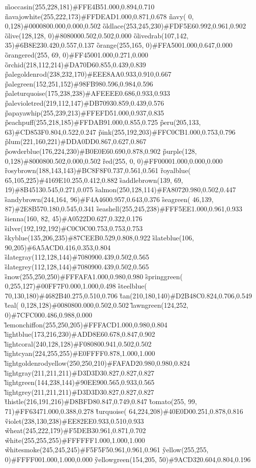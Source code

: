 \G{moccasin}{(255,228,181)}{\#FFE4B5}{1.000,0.894,0.710}
\G{navajowhite}{(255,222,173)}{\#FFDEAD}{1.000,0.871,0.678}
\G{navy}{(  0,  0,128)}{\#000080}{0.000,0.000,0.502}
\G{oldlace}{(253,245,230)}{\#FDF5E6}{0.992,0.961,0.902}
\G{olive}{(128,128,  0)}{\#808000}{0.502,0.502,0.000}
\G{olivedrab}{(107,142, 35)}{\#6B8E23}{0.420,0.557,0.137}
\G{orange}{(255,165,  0)}{\#FFA500}{1.000,0.647,0.000}
\G{orangered}{(255, 69,  0)}{\#FF4500}{1.000,0.271,0.000}
\G{orchid}{(218,112,214)}{\#DA70D6}{0.855,0.439,0.839}
\G{palegoldenrod}{(238,232,170)}{\#EEE8AA}{0.933,0.910,0.667}
\G{palegreen}{(152,251,152)}{\#98FB98}{0.596,0.984,0.596}
\G{paleturquoise}{(175,238,238)}{\#AFEEEE}{0.686,0.933,0.933}
\G{palevioletred}{(219,112,147)}{\#DB7093}{0.859,0.439,0.576}
\G{papayawhip}{(255,239,213)}{\#FFEFD5}{1.000,0.937,0.835}
\G{peachpuff}{(255,218,185)}{\#FFDAB9}{1.000,0.855,0.725}
\G{peru}{(205,133, 63)}{\#CD853F}{0.804,0.522,0.247}
\G{pink}{(255,192,203)}{\#FFC0CB}{1.000,0.753,0.796}
\G{plum}{(221,160,221)}{\#DDA0DD}{0.867,0.627,0.867}
\G{powderblue}{(176,224,230)}{\#B0E0E6}{0.690,0.878,0.902}
\G{purple}{(128,  0,128)}{\#800080}{0.502,0.000,0.502}
\G{red}{(255,  0,  0)}{\#FF0000}{1.000,0.000,0.000}
\G{rosybrown}{(188,143,143)}{\#BC8F8F}{0.737,0.561,0.561}
\G{royalblue}{( 65,105,225)}{\#4169E1}{0.255,0.412,0.882}
\G{saddlebrown}{(139, 69, 19)}{\#8B4513}{0.545,0.271,0.075}
\G{salmon}{(250,128,114)}{\#FA8072}{0.980,0.502,0.447}
\G{sandybrown}{(244,164, 96)}{\#F4A460}{0.957,0.643,0.376}
\G{seagreen}{( 46,139, 87)}{\#2E8B57}{0.180,0.545,0.341}
\G{seashell}{(255,245,238)}{\#FFF5EE}{1.000,0.961,0.933}
\G{sienna}{(160, 82, 45)}{\#A0522D}{0.627,0.322,0.176}
\G{silver}{(192,192,192)}{\#C0C0C0}{0.753,0.753,0.753}
\G{skyblue}{(135,206,235)}{\#87CEEB}{0.529,0.808,0.922}
\G{slateblue}{(106, 90,205)}{\#6A5ACD}{0.416,0.353,0.804}
\G{slategray}{(112,128,144)}{\#708090}{0.439,0.502,0.565}
\G{slategrey}{(112,128,144)}{\#708090}{0.439,0.502,0.565}
\G{snow}{(255,250,250)}{\#FFFAFA}{1.000,0.980,0.980}
\G{springgreen}{(  0,255,127)}{\#00FF7F}{0.000,1.000,0.498}
\G{steelblue}{( 70,130,180)}{\#4682B4}{0.275,0.510,0.706}
\G{tan}{(210,180,140)}{\#D2B48C}{0.824,0.706,0.549}
\G{teal}{(  0,128,128)}{\#008080}{0.000,0.502,0.502}
\G{lawngreen}{(124,252,  0)}{\#7CFC00}{0.486,0.988,0.000}
\G{lemonchiffon}{(255,250,205)}{\#FFFACD}{1.000,0.980,0.804}
\G{lightblue}{(173,216,230)}{\#ADD8E6}{0.678,0.847,0.902}
\G{lightcoral}{(240,128,128)}{\#F08080}{0.941,0.502,0.502}
\G{lightcyan}{(224,255,255)}{\#E0FFFF}{0.878,1.000,1.000}
\G{lightgoldenrodyellow}{(250,250,210)}{\#FAFAD2}{0.980,0.980,0.824}
\G{lightgray}{(211,211,211)}{\#D3D3D3}{0.827,0.827,0.827}
\G{lightgreen}{(144,238,144)}{\#90EE90}{0.565,0.933,0.565}
\G{lightgrey}{(211,211,211)}{\#D3D3D3}{0.827,0.827,0.827}
\G{thistle}{(216,191,216)}{\#D8BFD8}{0.847,0.749,0.847}
\G{tomato}{(255, 99, 71)}{\#FF6347}{1.000,0.388,0.278}
\G{turquoise}{( 64,224,208)}{\#40E0D0}{0.251,0.878,0.816}
\G{violet}{(238,130,238)}{\#EE82EE}{0.933,0.510,0.933}
\G{wheat}{(245,222,179)}{\#F5DEB3}{0.961,0.871,0.702}
\G{white}{(255,255,255)}{\#FFFFFF}{1.000,1.000,1.000}
\G{whitesmoke}{(245,245,245)}{\#F5F5F5}{0.961,0.961,0.961}
\G{yellow}{(255,255,  0)}{\#FFFF00}{1.000,1.000,0.000}
\G{yellowgreen}{(154,205, 50)}{\#9ACD32}{0.604,0.804,0.196}
